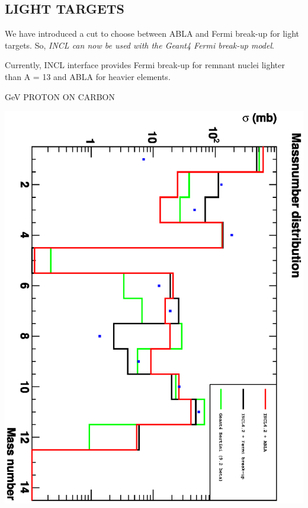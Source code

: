 \documentclass[20pt]{article}
\newenvironment{textbox}
{\begin{lrbox}{\dummybox}\begin{minipage}{0.9\columnwidth}}
{\end{minipage}\end{lrbox}\raisebox{-\depth}{\psshadowbox[framesep=1em,framearc=.1,shadow=true]{\usebox{\dummybox}}}\vspace{0.005\textheight}}
\begin{document}
\begin{center}
\begin{multicols}{3}
\begin{textbox}
\section*{{\Huge {\sf LIGHT TARGETS}}}

{\color{udsect}
We have introduced a cut to choose between {\sf ABLA} and Fermi break-up for light targets.
So, \emph{{\sf INCL} can now be used with the {\sf Geant4} Fermi break-up model}.
}

\vspace{1cm}
Currently, {\sf INCL} interface provides Fermi break-up \cite{g4incl} for
remnant nuclei lighter than A = 13 and {\sf ABLA} for heavier elements.
\end{textbox}

\begin{center}
{\Huge { GeV PROTON  ON CARBON}}

\vspace{1cm}
\includegraphics[scale=0.72,angle=90]{images/masses.eps}
\end{center}


\end{multicols}
\end{center}
\end{document}
